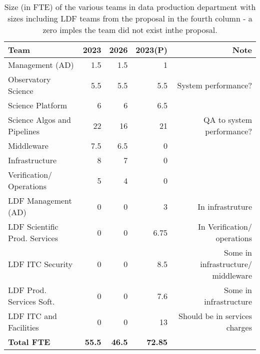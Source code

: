  \begin{longtable} { |p{}  |r  |r  |r  |r |} 
\caption{Size (in FTE) of the various teams in data production department with sizes including LDF teams from the proposal in the fourth column - a zero imples the team did not exist inthe proposal. \label{tab:FTE}}\\ 
\hline 
\textbf{Team}&\textbf{2023}&\textbf{2026}&\textbf{2023(P)}&\textbf{Note} \\ \hline
{Management (AD)}&{1.5}&{1.5}&{1}& \\ \hline
{Observatory Science }&{5.5}&{5.5}&{5.5}&{System performance?} \\ \hline
{Science Platform}&{6}&{6}&{6.5}& \\ \hline
{Science Algos and Pipelines}&{22}&{16}&{21}&{QA  to system performance?} \\ \hline
{Middleware}&{7.5}&{6.5}&{0}& \\ \hline
{Infrastructure}&{8}&{7}&{0}&{ } \\ \hline
{Verification/ Operations}&{5}&{4}&{0}& \\ \hline
{LDF Management (AD) }&{0}&{0}&{3}&{In infrastruture} \\ \hline
{LDF Scientific Prod. Services}&{0}&{0}&{6.75}&{In Verification/ operations} \\ \hline
{LDF ITC Security}&{0}&{0}&{8.5}&{Some in infrastructure/ middleware } \\ \hline
{LDF Prod. Services Soft.}&{0}&{0}&{7.6}&{Some in infrastructure} \\ \hline
{LDF ITC and Facilities}&{0}&{0}&{13}&{Should be in services charges} \\ \hline
\textbf{Total  FTE}&\textbf{55.5}&\textbf{46.5}&\textbf{72.85}& \\ \hline
\end{longtable}
